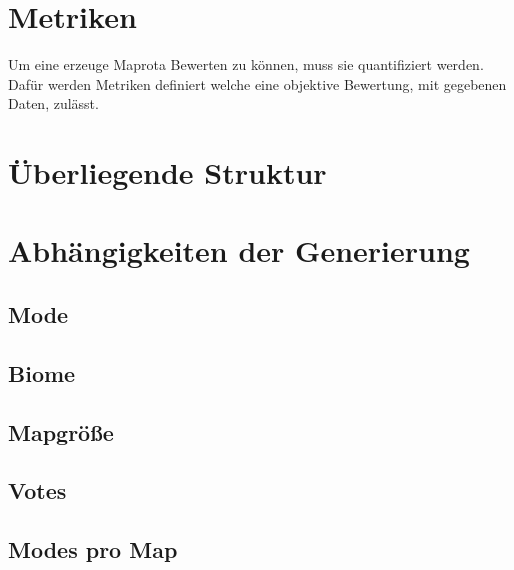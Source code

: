 \documentclass[a4paper, 11pt]{scrartcl}
\begin{document}
    \section{Metriken}
    Um eine erzeuge Maprota Bewerten zu können, muss sie quantifiziert werden. 
    Dafür werden Metriken definiert welche eine objektive Bewertung, mit gegebenen Daten, zulässt.    



    \section{Überliegende Struktur}
    \section{Abhängigkeiten der Generierung}
    \subsection{Mode}
    \subsection{Biome}
    \subsection{Mapgröße}
    \subsection{Votes}
    \subsection{Modes pro Map}

    \newpage

    \printbibliography[title=Literaturverzeichnis]
\end{document}
